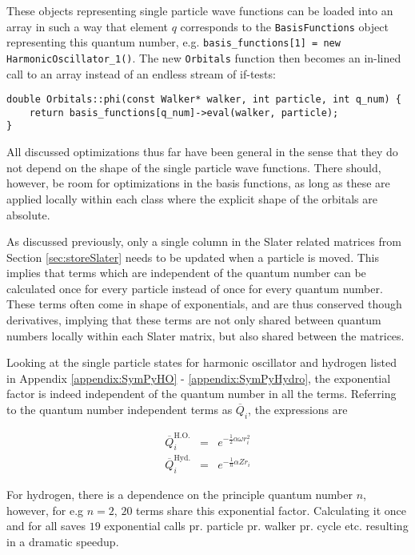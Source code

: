 These objects representing single particle wave functions can be loaded into an array in such a way that element $q$ corresponds to the \verb+BasisFunctions+ object representing this quantum number, e.g. \verb+basis_functions[1] = new HarmonicOscillator_1()+. The new \verb+Orbitals+ function then becomes an in-lined call to an array instead of an endless stream of if-tests:

\vspace{0.5cm}
\begin{lstlisting}
double Orbitals::phi(const Walker* walker, int particle, int q_num) {
    return basis_functions[q_num]->eval(walker, particle);
}
\end{lstlisting}

All discussed optimizations thus far have been general in the sense that they do not depend on the shape of the single particle wave functions. There should, however, be room for optimizations in the basis functions, as long as these are applied locally within each class where the explicit shape of the orbitals are absolute.

As discussed previously, only a single column in the Slater related matrices from Section \ref{sec:storeSlater} needs to be updated when a particle is moved. This implies that terms which are independent of the quantum number can be calculated once for every particle instead of once for every quantum number. These terms often come in shape of exponentials, and are thus conserved though derivatives, implying that these terms are not only shared between quantum numbers locally within each Slater matrix, but also shared between the matrices.

Looking at the single particle states for harmonic oscillator and hydrogen listed in Appendix \ref{appendix:SymPyHO} - \ref{appendix:SymPyHydro}, the exponential factor is indeed independent of the quantum number in all the terms. Referring to the quantum number independent terms as $\overline{Q}_i$, the expressions are 

\begin{eqnarray}
\overline{Q}_i^\mathrm{H.O.} &=& e^{-\frac{1}{2}\alpha\omega r_i^2} \\
 \overline{Q}_i^\mathrm{Hyd.} &=& e^{-\frac{1}{n}\alpha Z r_i}
\end{eqnarray}

For hydrogen, there is a dependence on the principle quantum number $n$, however, for e.g $n=2$,  $20$ terms share this exponential factor. Calculating it once and for all saves $19$ exponential calls pr. particle pr. walker pr. cycle etc. resulting in a dramatic speedup.

